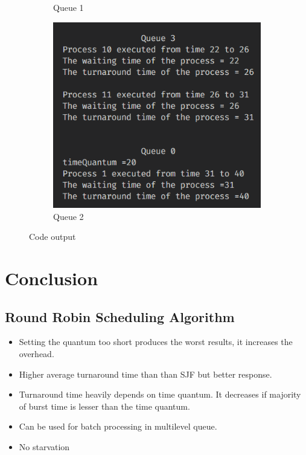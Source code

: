 \documentclass{article}
\begin{document}
\begin{figure}[t!]
\begin{subfigure}[b]{0.45\textwidth}
    \caption{Queue 1}
    \label{fig:queue1}
  \end{subfigure}
  \hfill
  \begin{subfigure}[b]{0.45\textwidth}
    \includegraphics[width=\textwidth]{6.png}
    \caption{Queue 2}
    \label{fig:queue2}
  \end{subfigure}
  \caption{Code output}
  \label{fig:both_queues}
\end{figure}

\clearpage
\newpage
\section{Conclusion}
\subsection{Round Robin Scheduling Algorithm}
\begin{itemize}
  \item Setting the quantum too short produces the worst results, it increases the overhead.
  \item Higher average turnaround time than than SJF but better response.
  \item Turnaround time heavily depends on time quantum. It decreases if majority of burst time is lesser than the time quantum.
  \item Can be used for batch processing in multilevel queue.
  \item No starvation
\end{itemize}
\end{document}
